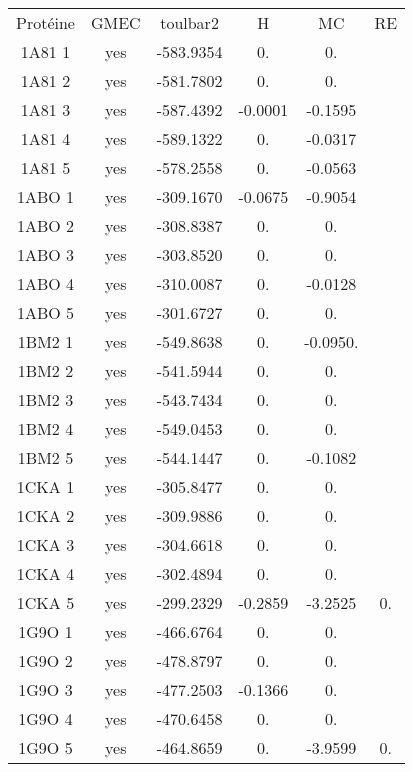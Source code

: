     \begin{table}[h]
      \centering

      \begin{tabular}{cccccc}


        \toprule
        Protéine & GMEC & toulbar2 & H & MC & RE \\
        \cmidrule{1-6}
        1A81 1 & yes & -583.9354 & 0. & 0. & \\
        1A81 2 & yes & -581.7802 & 0. & 0. & \\
        1A81 3 & yes & -587.4392 & -0.0001 & -0.1595 & \\
        1A81 4 & yes & -589.1322 & 0. & -0.0317 & \\
        1A81 5 & yes & -578.2558 & 0. & -0.0563 & \\
        1ABO 1 & yes & -309.1670 & -0.0675 & -0.9054 & \\
        1ABO 2 & yes & -308.8387 & 0. & 0. & \\
        1ABO 3 & yes & -303.8520 & 0. & 0. & \\
        1ABO 4 & yes & -310.0087 & 0. & -0.0128 & \\
        1ABO 5 & yes & -301.6727 & 0. & 0. & \\
        1BM2 1 & yes & -549.8638 & 0. & -0.0950. & \\
        1BM2 2 & yes & -541.5944 & 0. & 0. & \\
        1BM2 3 & yes & -543.7434 & 0. & 0. & \\
        1BM2 4 & yes & -549.0453 & 0. & 0. & \\
        1BM2 5 & yes & -544.1447 & 0. & -0.1082 & \\
        1CKA 1 & yes & -305.8477 & 0. & 0. & \\
        1CKA 2 & yes & -309.9886 & 0. & 0. & \\
        1CKA 3 & yes & -304.6618 & 0. & 0. & \\
        1CKA 4 & yes & -302.4894 & 0. & 0. & \\
        1CKA 5 & yes & -299.2329 & -0.2859 & -3.2525 & 0. \\
        1G9O 1 & yes & -466.6764 & 0. & 0. & \\
        1G9O 2 & yes & -478.8797 & 0. & 0. & \\
        1G9O 3 & yes & -477.2503 & -0.1366 & 0. & \\
        1G9O 4 & yes & -470.6458 & 0. & 0. & \\
        1G9O 5 & yes & -464.8659 & 0. & -3.9599 & 0.\\

\end{tabular}
\end{table}
